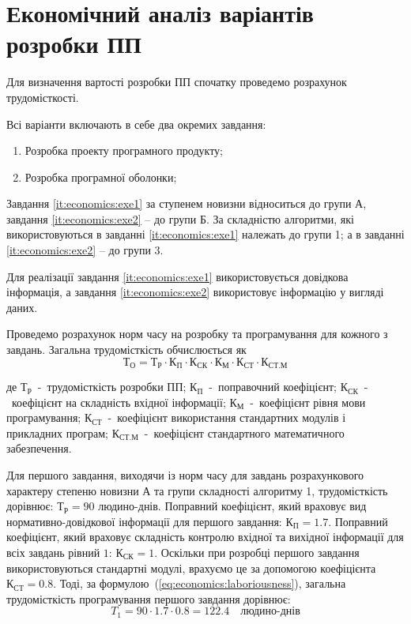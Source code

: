 \section{Економічний аналіз варіантів розробки ПП}

Для визначення вартості розробки ПП спочатку проведемо розрахунок трудомісткості. 

Всі варіанти включають в себе два окремих завдання:
\begin{enumerate}
	\item \label{it:economics:exe1}Розробка проекту програмного продукту;
	\item \label{it:economics:exe2}Розробка програмної оболонки; 
\end{enumerate}

Завдання \ref{it:economics:exe1} за ступенем новизни відноситься до групи А, завдання \ref{it:economics:exe2} – до групи Б. За складністю алгоритми, які використовуються в завданні \ref{it:economics:exe1} належать до групи 1; а в завданні \ref{it:economics:exe2} – до групи 3. 

Для реалізації завдання \ref{it:economics:exe1} використовується довідкова інформація, а завдання \ref{it:economics:exe2}  використовує інформацію у вигляді даних. 

Проведемо розрахунок норм часу на розробку та програмування для кожного з завдань. Загальна трудомісткість обчислюється як 
\newcommand{\coe}[2]{\text{#1}_\text{#2}}
\begin{equation}
	\label{eq:economics:laboriousness}
	\coe{Т}{О} = \coe{Т}{Р} 
	\cdot
	\coe{К}{П}
	\cdot
	\coe{К}{СК}
	\cdot
	\coe{К}{М}
	\cdot
	\coe{К}{СТ}
	\cdot
	\coe{К}{СТ.М}
\end{equation}

де $ \coe{Т}{Р} $~-~трудомісткість розробки ПП; $ \coe{К}{П} $~-~поправочний коефіцієнт; $ \coe{К}{СК} $~-~коефіцієнт на складність вхідної інформації; $ \coe{К}{М} $~-~коефіцієнт рівня мови програмування; $ \coe{К}{СТ} $~-~коефіцієнт використання стандартних модулів і прикладних програм; $ \coe{К}{СТ.М} $~-~коефіцієнт стандартного математичного забезпечення.

Для першого завдання, виходячи із норм часу для завдань розрахункового характеру степеню новизни А та групи складності алгоритму 1, трудомісткість дорівнює: $ \coe{Т}{Р} = 90 $ людино-днів. Поправний коефіцієнт, який враховує вид нормативно-довідкової інформації для першого завдання: $ \coe{К}{П} = 1.7 $. Поправний коефіцієнт, який враховує складність контролю вхідної та вихідної інформації для всіх завдань рівний $1$: $ \coe{К}{СК} = 1 $. Оскільки при розробці першого завдання використовуються стандартні модулі, врахуємо це за допомогою коефіцієнта $ \coe{К}{СТ} = 0.8 $. Тоді, за формулою~(\ref{eq:economics:laboriousness}), загальна трудомісткість програмування першого завдання дорівнює: 
\begin{equation*}
	T_1 = 90\cdot 1.7\cdot 0.8 = 122.4 \quad\text{людино-днів}
\end{equation*}

